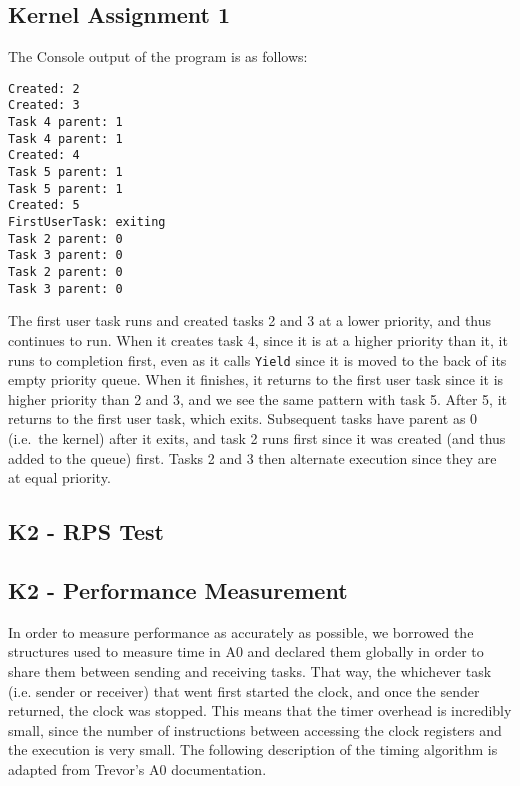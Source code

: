 \documentclass[12pt, titlepage]{article}
\begin{document}
    \subsection{Kernel Assignment 1}
    The Console output of the program is as follows:
    \begin{verbatim}
Created: 2
Created: 3
Task 4 parent: 1
Task 4 parent: 1
Created: 4
Task 5 parent: 1
Task 5 parent: 1
Created: 5
FirstUserTask: exiting
Task 2 parent: 0
Task 3 parent: 0
Task 2 parent: 0
Task 3 parent: 0
    \end{verbatim}
    The first user task runs and created tasks 2 and 3 at a lower priority, and thus continues to run. When it creates task 4, since it is at a higher priority than it, it runs to completion first, even as it calls \verb`Yield` since it is moved to the back of its empty priority queue. When it finishes, it returns to the first user task since it is higher priority than 2 and 3, and we see the same pattern with task 5. After 5, it returns to the first user task, which exits. Subsequent tasks have parent as 0 (i.e.\ the kernel) after it exits, and task 2 runs first since it was created (and thus added to the queue) first. Tasks 2 and 3 then alternate execution since they are at equal priority.

    \subsection{K2 - RPS Test}

    \subsection{K2 - Performance Measurement}

    In order to measure performance as accurately as possible, we borrowed the structures used to measure time in A0 and declared them globally in order to share them between sending and receiving tasks. That way, the whichever task (i.e. sender or receiver) that went first started the clock, and once the sender returned, the clock was stopped. This means that the timer overhead is incredibly small, since the number of instructions between accessing the clock registers and the execution is very small. The following description of the timing algorithm is adapted from Trevor's A0 documentation.
\end{document}

